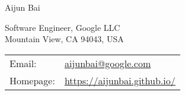 \documentclass[letterpaper,10pt]{article}
\def\name{Aijun Bai}
\begin{document}
\begin{flushleft}
	{\huge \name}
\end{flushleft}

\bigskip

\begin{minipage}{0.5\textwidth}
	Software Engineer, Google LLC\\
	Mountain View, CA 94043, USA
\end{minipage}
\begin{minipage}{0.5\textwidth}
	\begin{tabular}{ll}
		Email:    & \href{mailto:aijunbai@google.com}{\rm aijunbai@google.com} \\
		Homepage: & \url{https://aijunbai.github.io/} \\
	\end{tabular}
\end{minipage}

\vspace{15pt}
\end{document}
